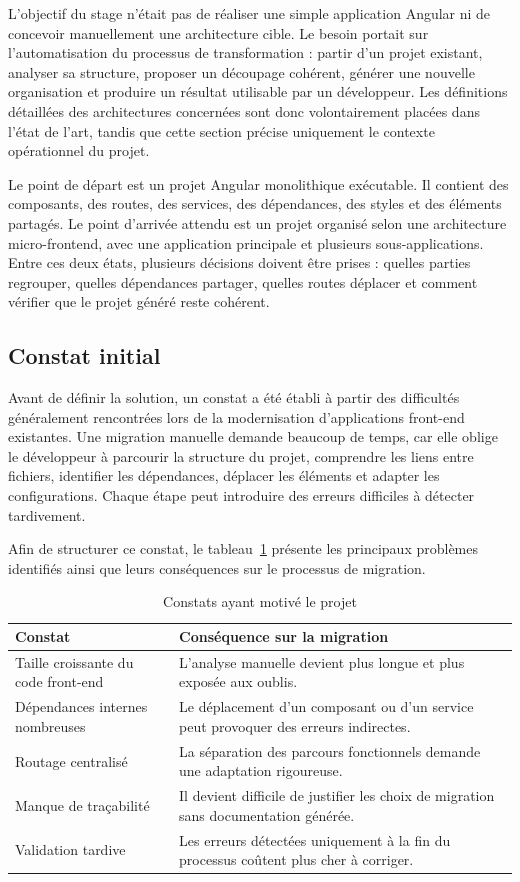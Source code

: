 L'objectif du stage n'était pas de réaliser une simple application Angular ni de concevoir manuellement une architecture cible. Le besoin portait sur l'automatisation du processus de transformation : partir d'un projet existant, analyser sa structure, proposer un découpage cohérent, générer une nouvelle organisation et produire un résultat utilisable par un développeur. Les définitions détaillées des architectures concernées sont donc volontairement placées dans l'état de l'art, tandis que cette section précise uniquement le contexte opérationnel du projet.

Le point de départ est un projet Angular monolithique exécutable. Il contient des composants, des routes, des services, des dépendances, des styles et des éléments partagés. Le point d'arrivée attendu est un projet organisé selon une architecture micro-frontend, avec une application principale et plusieurs sous-applications. Entre ces deux états, plusieurs décisions doivent être prises : quelles parties regrouper, quelles dépendances partager, quelles routes déplacer et comment vérifier que le projet généré reste cohérent.

\subsection{Constat initial}

Avant de définir la solution, un constat a été établi à partir des difficultés généralement rencontrées lors de la modernisation d'applications front-end existantes. Une migration manuelle demande beaucoup de temps, car elle oblige le développeur à parcourir la structure du projet, comprendre les liens entre fichiers, identifier les dépendances, déplacer les éléments et adapter les configurations. Chaque étape peut introduire des erreurs difficiles à détecter tardivement.

Afin de structurer ce constat, le tableau~\ref{tab:constat-projet} présente les principaux problèmes identifiés ainsi que leurs conséquences sur le processus de migration.

\begingroup
\renewcommand{\arraystretch}{1.25}
\begin{longtable}{|p{4cm}|p{10cm}|}
\caption{Constats ayant motivé le projet}\label{tab:constat-projet}\\
\hline
\textbf{Constat} & \textbf{Conséquence sur la migration} \\
\hline
Taille croissante du code front-end & L'analyse manuelle devient plus longue et plus exposée aux oublis. \\
\hline
Dépendances internes nombreuses & Le déplacement d'un composant ou d'un service peut provoquer des erreurs indirectes. \\
\hline
Routage centralisé & La séparation des parcours fonctionnels demande une adaptation rigoureuse. \\
\hline
Manque de traçabilité & Il devient difficile de justifier les choix de migration sans documentation générée. \\
\hline
Validation tardive & Les erreurs détectées uniquement à la fin du processus coûtent plus cher à corriger. \\
\hline
\end{longtable}
\endgroup

